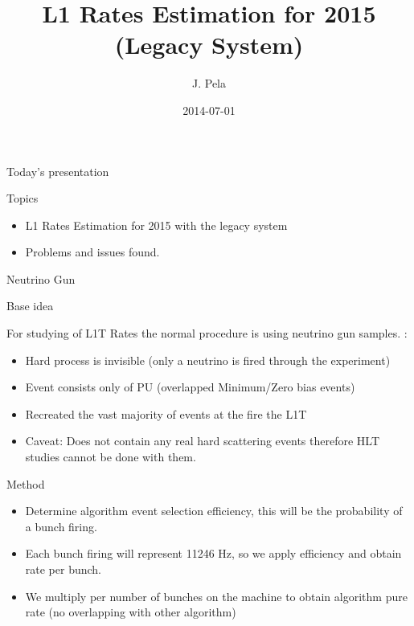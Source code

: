 \documentclass[8pt]{beamer}
\author[J. Pela]{J. Pela}
\title{L1 Rates Estimation for 2015 (Legacy System)}
\institute[ICL]{Imperial College London}
\date{2014-07-01}
\begin{document}
\setlength{\unitlength}{1mm}

\begin{frame}
  \titlepage
\end{frame}

\begin{frame}{Today's presentation}
 
\begin{block}{Topics}
 
\begin{itemize}
  \item L1 Rates Estimation for 2015 with the legacy system
  \item Problems and issues found.
\end{itemize}

\end{block}

\end{frame}

\begin{frame}{Neutrino Gun}

\begin{block}{Base idea}
 
For studying of L1T Rates the normal procedure is using neutrino gun samples. :
\begin{itemize}
 \item Hard process is invisible (only a neutrino is fired through the experiment)
 \item Event consists only of PU (overlapped Minimum/Zero bias events)
 \item Recreated the vast majority of events at the fire the L1T
 \item Caveat: Does not contain any real hard scattering events therefore HLT studies cannot be done with them.
\end{itemize}

\end{block}

\begin{block}{Method}
 
\begin{itemize}
 \item Determine algorithm event selection efficiency, this will be the probability of a bunch firing.
 \item Each bunch firing will represent 11246 Hz, so we apply efficiency and obtain rate per bunch.
 \item We multiply per number of bunches on the machine to obtain algorithm pure rate (no overlapping with other algorithm)
\end{itemize}
 
\end{block}

\end{frame}
                                                                                                                              
\end{document}
